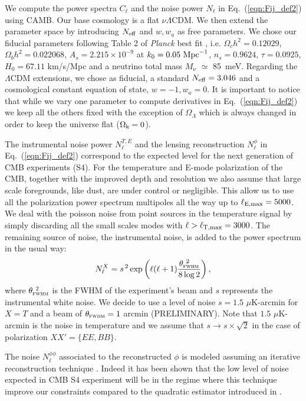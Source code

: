 \documentclass[aps,prd,reprint,superscriptaddress]{revtex4-1}
\newcommand\refeq[1]{Eq.~(\ref{eqn:#1})}
\begin{document}
We compute the power spectra $C_{\ell}$ and the noise power $N_{\ell}$ in \refeq{Fij_def2} using CAMB.
Our base cosmology is a flat $\nu \Lambda$CDM. 
We then extend the parameter space by introducing $N_{\rm eff}$ and $w,w_{a}$ as free parameters.
We chose our fiducial parameters following Table 2 of \textit{Planck} best fit \cite{planck-collaboration:2014g}, i.e. $\Omega_c h^2 = 0.12029$, $\Omega_b h^2 = 0.022068$, $A_s = 2.215\times10^{-9}$ at $k_0 = 0.05\ {\rm Mpc}^{-1}$, $n_s = 0.9624$, $\tau = 0.0925$, $H_0 = 67.11$ km/s/Mpc and a neutrino total mass $M_{\nu}$ $\simeq$ 85\ meV.  
Regarding the $\Lambda$CDM extensions, we chose as fiducial, a standard $N_{\rm eff}=3.046$ and a cosmological constant equation of state, $w=-1,w_{a}=0$.
It is important to notice that while we vary one parameter to compute derivatives in \refeq{Fij_def2} we keep all the others fixed with the exception of $\Omega_{\Lambda}$ which is always changed in order to keep the universe flat ($\Omega_{\rm k} = 0$).

The instrumental noise power $N_{\ell}^{T,E}$ and the lensing reconstruction $N_{\ell}^{\phi}$ in \refeq{Fij_def2} correspond to the expected level for the next generation of CMB experiments (S4).
For the temperature and E-mode polarization of the CMB, together with the improved depth and resolution we also assume that large scale foregrounds, like dust, are under control or negligible. This allow us to use all the polarization power spectrum multipoles all the way up to $\ell_{\rm E,max}=5000$. We deal with the poisson noise from point sources in the temperature signal by simply discarding all the small scales modes with $\ell>\ell_{\rm T,max}=3000$.
The remaining source of noise, the instrumental noise, is added to the power spectrum in the usual way:
 \begin{equation}
 	\centering
		N^{X}_\ell = s^{\, 2} \exp \left(\ell(\ell+1) \frac{\theta^{\ 2}_{\textsc{fwhm}}}{8\log2}\right),
	\label{eq:beamnoise}
\end{equation}
where $\theta^{\ 2}_{\textsc{fwhm}}$ is the FWHM of the experiment's beam and $s$ represents the instrumental white noise.
We decide to use a level of noise $s = 1.5$ $\mu$K-arcmin for $X=T$ and a beam of $\theta_{\textsc{fwhm}}=1$ arcmin (PRELIMINARY).
Note that $1.5$ $\mu$K-arcmin is the noise in temperature and we assume that $s \rightarrow s\times \sqrt{2}$ in the case of polarization $ XX' = \{ EE, BB \}$.


The noise $N_\ell^{\phi\phi}$ associated to the reconstructed $\phi$ is modeled assuming an iterative reconstruction technique \cite{seljak:2004}. Indeed it has been shown that the low level of noise expected in CMB S4 experiment will be in the regime  where this technique improve our constraints compared to the quadratic estimator introduced in \cite{okamoto:2003,hu:2002}.
\end{document}
